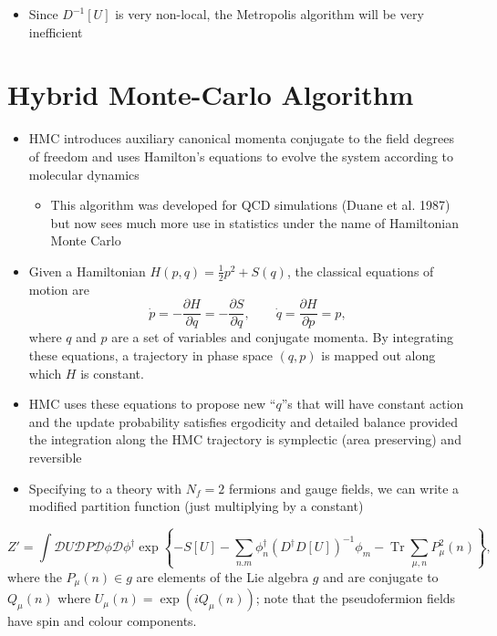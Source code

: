 \begin{itemize}
  \item Since \(D^{-1}[U]\) is very non-local, the Metropolis algorithm will be very inefficient
\end{itemize}


\section{Hybrid Monte-Carlo Algorithm}
\begin{itemize}
    \item HMC introduces auxiliary canonical momenta conjugate to the field degrees of freedom and uses Hamilton's equations to evolve the system according to molecular dynamics
    \begin{itemize}
        \item This algorithm was developed for QCD simulations (Duane et al. 1987) but now sees much more use in statistics under the name of Hamiltonian Monte Carlo
    \end{itemize}
    \item Given a Hamiltonian $H(p,q) = \frac{1}{2}p^2 + S(q)$, the classical equations of motion are
    \begin{equation}
        \dot{p} = - \frac{\partial H}{\partial q} = - \frac{\partial S}{\partial q}, \qquad \dot{q} = \frac{\partial H}{\partial p} = p,
    \end{equation}
    where $q$ and $p$ are a set of variables and conjugate momenta. By integrating these equations, a trajectory in phase space $(q,p)$ is mapped out along which $H$ is constant.
    \item HMC uses these equations to propose new ``$q$''s that will have constant action and the update probability satisfies ergodicity and detailed balance provided the integration along the HMC trajectory is symplectic (area preserving) and reversible
    \item Specifying to a theory with $N_f = 2$ fermions and gauge fields, we can write a modified partition function (just multiplying by a constant)
\end{itemize}
\begin{equation}
    Z' = \int \mathcal{D}U \mathcal{D}P \mathcal{D}\phi \mathcal{D}\phi^\dagger \exp\left\{-S[U] - \sum_{n.m}\phi_n^\dagger (D^\dagger D[U])^{-1}\phi_m - \operatorname{Tr}\sum_{\mu,n} P_\mu^2(n) \right\},
\end{equation}
where the $P_\mu(n) \in g$ are elements of the Lie algebra $g$ and are conjugate to $Q_\mu(n)$ where $U_\mu(n) = \exp(i Q_\mu(n))$; note that the pseudofermion fields have spin and colour components.

